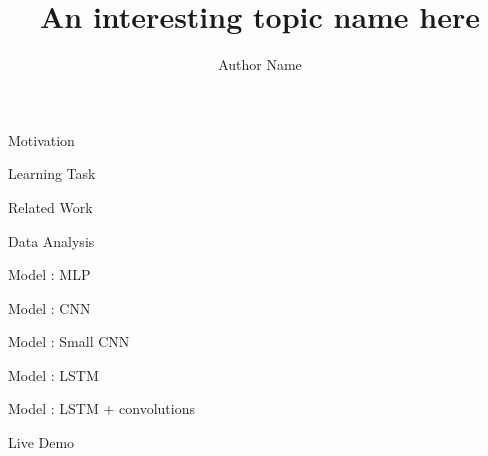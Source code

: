 \documentclass{beamer}
\title{An interesting topic name here}
\author{Author Name}
\begin{document}
	
	\begin{frame}
		\titlepage
	\end{frame}
	
	\begin{frame}{Motivation} 

	\end{frame}

	\begin{frame}{Learning Task} 

	\end{frame}

	\begin{frame}{Related Work} 

	\end{frame}
	
	\begin{frame}{Data Analysis} 

	\end{frame}
	
	\begin{frame}{Model : MLP}

	\end{frame}

	\begin{frame}{Model : CNN}

	\end{frame}
	\begin{frame}{Model : Small CNN}

	\end{frame}	
	
	\begin{frame}{Model : LSTM}

	\end{frame}	
	
	\begin{frame}{Model : LSTM + convolutions}

	\end{frame}

	\begin{frame}{Live Demo}

	\end{frame}	
	
\end{document}
